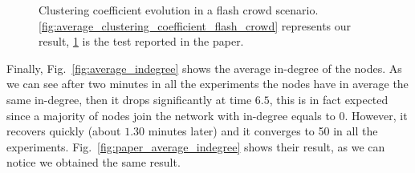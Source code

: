 \begin{figure}
\begin{subfigure}{.5\textwidth}
  \caption{}
  \label{fig:paper_average_clustering_coefficient_flash_crowd}
\end{subfigure}
\caption{Clustering coefficient evolution in a flash crowd scenario. \ref{fig:average_clustering_coefficient_flash_crowd} represents our result, \ref{fig:paper_average_clustering_coefficient_flash_crowd} is the test reported in the paper.}
\label{fig:robustness_cc_flash_crowd}
\end{figure}

Finally, Fig.~\ref{fig:average_indegree} shows the average in-degree of the nodes. As we can see after two minutes in all the experiments the nodes have in average the same in-degree, then it drops significantly at time $6.5$, this is in fact expected since a majority of nodes join the network with in-degree equals to $0$. However, it recovers quickly (about $1.30$ minutes later) and it converges to 50 in all the experiments. Fig.~\ref{fig:paper_average_indegree} shows their result, as we can notice we obtained the same result.

